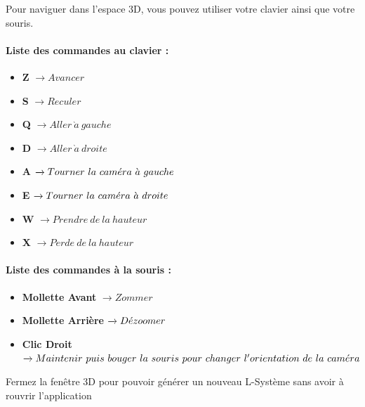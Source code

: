 Pour naviguer dans l'espace 3D, vous pouvez utiliser votre clavier ainsi que votre souris. 

\paragraph{Liste des commandes au clavier : }
\begin{itemize}
    \item \textbf{Z} $\xrightarrow{} Avancer$
    \item \textbf{S} $\xrightarrow{} Reculer$
    \item \textbf{Q} $\xrightarrow{} Aller \ \grave{a} \ gauche$
    \item \textbf{D} $\xrightarrow{} Aller \ \grave{a} \ droite$
    \item \textbf{A} $\xrightarrow{} Tourner \ la \ cam\Acute{e}ra \ \grave{a} \ gauche$
    \item \textbf{E} $\xrightarrow{} Tourner \ la \ cam\Acute{e}ra \ \grave{a} \ droite$
    \item \textbf{W} $\xrightarrow{} Prendre \ de \ la \ hauteur$
    \item \textbf{X} $\xrightarrow{} Perde \ de \ la \ hauteur$
    \end{itemize}
\paragraph{Liste des commandes à la souris :}
    \begin{itemize}
    \item \textbf{Mollette Avant} $\xrightarrow{} Zommer$
    \item \textbf{Mollette Arrière} $\xrightarrow{} D\Acute{e}zoomer$
    \item \textbf{Clic Droit} $\xrightarrow{} Maintenir \ puis \ bouger \ la \ souris \ pour \ changer \ l'orientation \ de \ la \ cam\Acute{e}ra$
    
\end{itemize}


Fermez la fenêtre 3D pour pouvoir générer un nouveau L-Système sans avoir à rouvrir l'application

